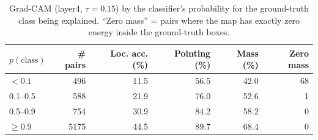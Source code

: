 \begin{table}[t]
\centering
\caption{Grad-CAM (layer4, $\tau=0.15$) by the classifier's probability for the ground-truth class being explained. ``Zero mass'' = pairs where the map has exactly zero energy inside the ground-truth boxes.}\label{tab:conf}
\begin{tabular}{lrrrrr}
\toprule
$p(\text{class})$ & \# pairs & Loc. acc. (\%) & Pointing (\%) & Mass (\%) & Zero mass \\
\midrule
$<0.1$ & 496 & 11.5 & 56.5 & 42.0 & 68 \\
0.1--0.5 & 588 & 21.9 & 76.0 & 52.6 & 1 \\
0.5--0.9 & 754 & 30.9 & 84.2 & 58.2 & 0 \\
$\ge0.9$ & 5175 & 44.5 & 89.7 & 68.4 & 0 \\
\bottomrule
\end{tabular}
\end{table}
